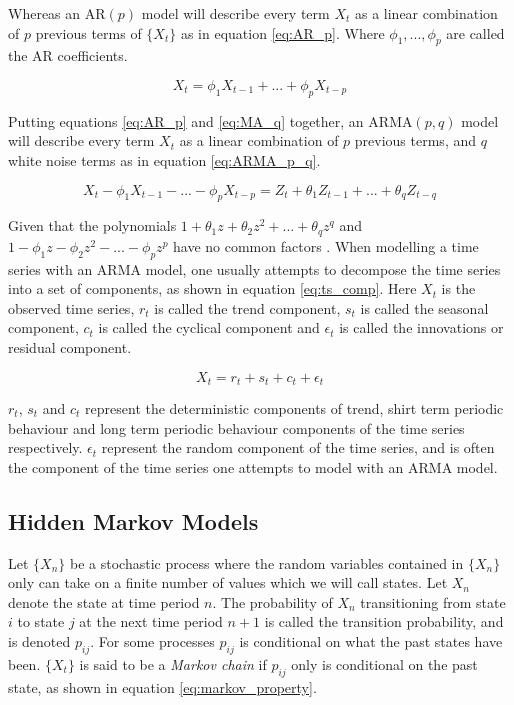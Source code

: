 Whereas an $\mathrm{AR}(p)$ model will describe every term $X_t$ as a linear combination of $p$ previous terms of $\{X_t\}$ as in equation \eqref{eq:AR_p}. Where $\phi_1, ... , \phi_p$ are called the AR coefficients.

\begin{equation}
    X_t = \phi_1 X_{t-1} + ... + \phi_p X_{t-p}
    \label{eq:AR_p}
\end{equation}

Putting equations \eqref{eq:AR_p} and \eqref{eq:MA_q} together, an $\mathrm{ARMA}(p,q)$ model will describe every term $X_t$ as a linear combination of $p$ previous terms, and $q$ white noise terms as in equation \eqref{eq:ARMA_p_q}.

\begin{equation}
    X_t - \phi_1 X_{t-1} - ... - \phi_p X_{t-p} = Z_{t} + \theta_1 Z_{t-1} + ... + \theta_q Z_{t-q}
    \label{eq:ARMA_p_q}
\end{equation}

Given that the polynomials $1 + \theta_1 z + \theta_2 z^2 + ... + \theta_q z^q$ and $1 - \phi_1 z - \phi_2 z^2 - ... - \phi_p z^p$ have no common factors \cite{brockwell_davis}.
When modelling a time series with an ARMA model, one usually attempts to decompose the time series into a set of components, as shown in equation \eqref{eq:ts_comp}. 
Here $X_t$ is the observed time series, 
$r_t$ is called the trend component, 
$s_t$ is called the seasonal component, 
$c_t$ is called the cyclical component 
and $\epsilon_t$ is called the innovations or residual component. 

\begin{equation}
    X_t = r_t + s_t + c_t + \epsilon_t
    \label{eq:ts_comp}
\end{equation}

$r_t$, $s_t$ and $c_t$ represent the deterministic components of trend, shirt term periodic behaviour and long term periodic behaviour components of the time series respectively. 
$\epsilon_t$ represent the random component of the time series, and is often the component of the time series one attempts to model with an ARMA model. 

\subsection{Hidden Markov Models} \label{s:hmm}
Let $\{X_n\}$ be a stochastic process where the random variables contained in $\{X_n\}$ only can take on a finite number of values which we will call states. 
Let $X_n$ denote the state at time period $n$. 
The probability of $X_n$ transitioning from state $i$ to state $j$ at the next time period $n+1$ is called the transition probability, and is denoted $p_{ij}$. 
For some processes $p_{ij}$ is conditional on what the past states have been. 
$\{X_t\}$ is said to be a \textit{Markov chain} if $p_{ij}$ only is conditional on the past state, as shown in equation \eqref{eq:markov_property}.

